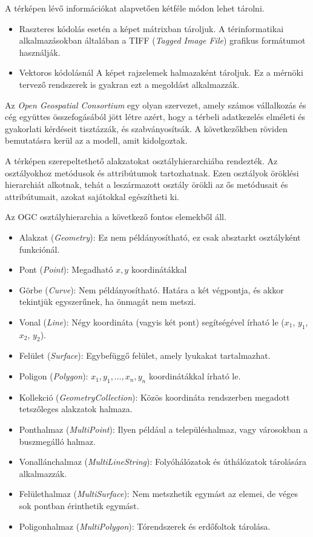 A térképen lévő információkat alapvetően kétféle módon lehet tárolni.
\begin{itemize}
\item Raszteres kódolás esetén a képet mátrixban tároljuk. A térinformatikai alkalmazásokban általában a TIFF (\textit{Tagged Image File}) grafikus formátumot használják.
\item Vektoros kódolásnál A képet rajzelemek halmazaként tároljuk. Ez a mérnöki tervező rendszerek is gyakran ezt a megoldást alkalmazzák.
\end{itemize}

Az \textit{Open Geospatial Consortium} egy olyan szervezet, amely számos vállalkozás és cég együttes összefogásából jött létre azért, hogy a térbeli adatkezelés elméleti és gyakorlati kérdéseit tisztázzák, és szabványosítsák. A következőkben röviden bemutatásra kerül az a modell, amit kidolgoztak.

A térképen szerepeltethető alakzatokat osztályhierarchiába rendezték. Az osztályokhoz metódusok és attribútumok tartozhatnak. Ezen osztályok öröklési hierarchiát alkotnak, tehát a leszármazott osztály örökli az ős metódusait és attribútumait, azokat sajátokkal egészítheti ki. 

Az OGC osztályhierarchia a következő fontos elemekből áll.
\begin{itemize}  
\item Alakzat (\textit{Geometry}): Ez nem példányosítható, ez csak absztarkt osztályként funkciónál.
\item Pont (\textit{Point}): Megadható $x, y$ koordinátákkal
\item Görbe (\textit{Curve}): Nem példányosítható. Határa a két végpontja, és akkor tekintjük egyszerűnek, ha önmagát nem metszi.
\item Vonal (\textit{Line}): Négy koordináta (vagyis két pont) segítségével írható le ($x_1$, $y_1$, $x_2$, $y_2$).
\item Felület (\textit{Surface}): Egybefüggő felület, amely lyukakat tartalmazhat.
\item Poligon (\textit{Polygon}): $x_1, y_1, \ldots, x_n, y_n$ koordinátákkal írható le.
\item Kollekció (\textit{GeometryCollection}): Közös koordináta rendszerben megadott tetszőleges alakzatok halmaza.
\item Ponthalmaz (\textit{MultiPoint}): Ilyen például a településhalmaz, vagy városokban a buszmegálló halmaz. 
\item Vonallánchalmaz (\textit{MultiLineString}): Folyóhálózatok és úthálózatok tárolására alkalmazzák.
\item Felülethalmaz (\textit{MultiSurface}): Nem metszhetik egymást az elemei, de véges sok pontban érinthetik egymást.
\item Poligonhalmaz (\textit{MultiPolygon}): Tórendszerek és erdőfoltok tárolása.
\end{itemize}

